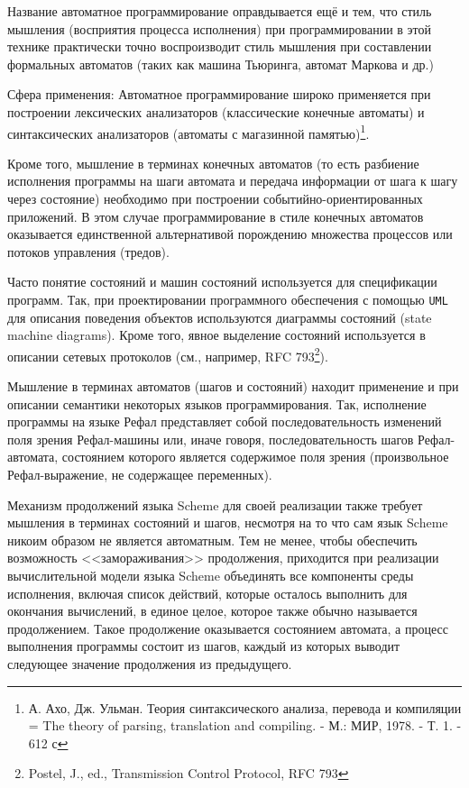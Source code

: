 \documentclass[12pt, twoside]{report}
\begin{document}
Название автоматное программирование оправдывается ещё и тем, что стиль мышления (восприятия процесса исполнения) при программировании в этой технике практически точно воспроизводит стиль мышления при составлении формальных автоматов (таких как машина Тьюринга, автомат Маркова и др.)

Сфера применения:
Автоматное программирование широко применяется при построении лексических анализаторов (классические конечные автоматы) и синтаксических анализаторов (автоматы с магазинной памятью)\footnote{А. Ахо, Дж. Ульман. Теория синтаксического анализа, перевода и компиляции = The theory of parsing, translation and compiling. - М.: МИР, 1978. - Т. 1. - 612 с}.

Кроме того, мышление в терминах конечных автоматов (то есть разбиение исполнения программы на шаги автомата и передача информации от шага к шагу через состояние) необходимо при построении событийно-ориентированных приложений. В этом случае программирование в стиле конечных автоматов оказывается единственной альтернативой порождению множества процессов или потоков управления (тредов).

Часто понятие состояний и машин состояний используется для спецификации программ. Так, при проектировании программного обеспечения с помощью \texttt{UML} для описания поведения объектов используются диаграммы состояний (state machine diagrams). Кроме того, явное выделение состояний используется в описании сетевых протоколов (см., например, RFC 793\footnote{Postel, J., ed., Transmission Control Protocol, RFC 793}).

Мышление в терминах автоматов (шагов и состояний) находит применение и при описании семантики некоторых языков программирования. Так, исполнение программы на языке Рефал представляет собой последовательность изменений поля зрения Рефал-машины или, иначе говоря, последовательность шагов Рефал-автомата, состоянием которого является содержимое поля зрения (произвольное Рефал-выражение, не содержащее переменных).

Механизм продолжений языка Scheme для своей реализации также требует мышления в терминах состояний и шагов, несмотря на то что сам язык Scheme никоим образом не является автоматным. Тем не менее, чтобы обеспечить возможность <<замораживания>> продолжения, приходится при реализации вычислительной модели языка Scheme объединять все компоненты среды исполнения, включая список действий, которые осталось выполнить для окончания вычислений, в единое целое, которое также обычно называется продолжением. Такое продолжение оказывается состоянием автомата, а процесс выполнения программы состоит из шагов, каждый из которых выводит следующее значение продолжения из предыдущего.
\end{document}
